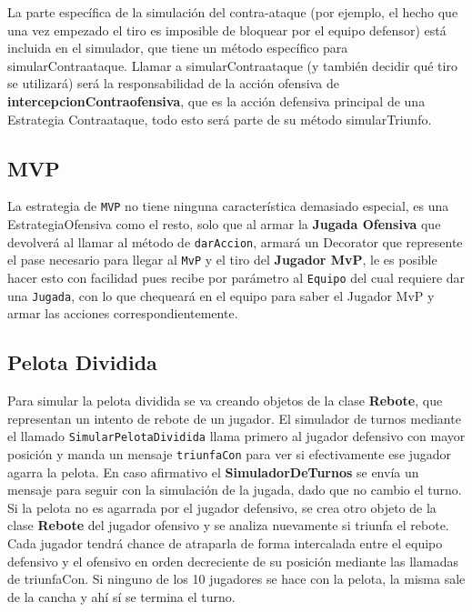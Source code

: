 La parte específica de la simulación del contra-ataque (por ejemplo, el hecho que una vez empezado el tiro es imposible de bloquear por el equipo defensor) está incluida en el simulador, que tiene un método específico para simularContraataque. Llamar a simularContraataque (y también decidir qué tiro se utilizará) será la responsabilidad de la acción ofensiva de \textbf{intercepcionContraofensiva}, que es la acción defensiva principal de una Estrategia Contraataque, todo esto será parte de su método simularTriunfo.

\subsection{MVP}

La estrategia de \texttt{MVP} no tiene ninguna característica demasiado especial, es una 
EstrategiaOfensiva como el resto, solo que al armar la \textbf{Jugada Ofensiva} que 
devolverá al llamar al método de \texttt{darAccion}, armará un Decorator que represente 
el pase necesario para llegar al \texttt{MvP} y el tiro del \textbf{Jugador MvP}, le es posible hacer esto con 
facilidad pues recibe por parámetro al \texttt{Equipo} del cual requiere dar una \texttt{Jugada}, 
con lo que chequeará en el equipo para saber el Jugador MvP y armar las acciones correspondientemente.

\subsection{Pelota Dividida}
Para simular la pelota dividida se va creando objetos de la clase \textbf{Rebote}, que representan
un intento de rebote de un jugador. El simulador de turnos mediante el llamado 
\texttt{SimularPelotaDividida} llama primero al jugador defensivo con mayor
 posición y manda un mensaje \texttt{triunfaCon} para ver si efectivamente ese jugador 
agarra la pelota.
En caso afirmativo el \textbf{SimuladorDeTurnos} se envía un mensaje 
para seguir con la simulación de la jugada, dado que no cambio el turno.
Si la pelota no es agarrada por el jugador defensivo, se crea otro objeto de la clase \textbf{Rebote}
del jugador ofensivo y se analiza nuevamente si triunfa el rebote.
Cada jugador tendrá chance de atraparla de forma intercalada entre el equipo 
defensivo y el ofensivo en orden decreciente de su posición mediante las 
llamadas de triunfaCon.
Si ninguno de los 10 jugadores se hace con la pelota, la misma sale de la 
cancha y ahí sí se termina el turno.

